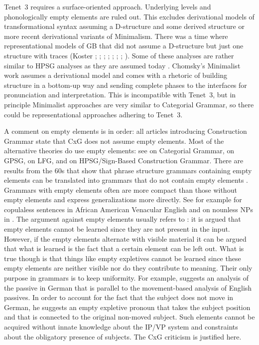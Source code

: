 \documentclass[output=paper]{langsci/langscibook}
\begin{document}
Tenet~3 requires a surface-oriented approach. Underlying levels and phonologically empty elements
are ruled out. This excludes derivational models of transformational syntax assuming a D-structure
and some derived structure or more recent derivational variants of Minimalism. There was a time
where representational models of GB that did not assume a D-structure but just one structure with
traces (Koster \citeyear[\page ]{Koster78b-u}; \citeyear[]{Koster87a-u}; 
\citealp{KT91a}; \citealp[Section~1.4]{Haider93a}; 
\citealp[]{Frey93a}; \citealp[--88, 177--178]{Lohnstein93a-u}; \citealp[]{FC94a}; \citealp[]{Veenstra98a}). Some of these analyses are rather similar to HPSG
analyses as they are assumed today \citep{Kiss95a,BvN98,Meurers2000b,Mueller2005c,MuellerGS,MuellerGermanic}. Chomsky's Minimalist work \citep{Chomsky95a-u} assumes a derivational model and comes
with a rhetoric of building structure in a bottom-up way and sending complete phases to the
interfaces for pronunciation and interpretation. This is incompatible with Tenet~3, but in principle
Minimalist approaches are very similar to Categorial Grammar, so there could be representational
approaches adhering to Tenet~3.

A comment on empty elements is in order: all articles introducing Construction Grammar state that
CxG does not assume empty elements. Most of the alternative theories do use empty elements: see
\citet{KoenigE99a-u} on Categorial Grammar, \citet*[]{GKPS85a} on GPSG, \citet[]{Bresnan2001a} on LFG,  and  on HPSG/Sign-Based
Construction Grammar. There are results from the 60s that show that phrase structure grammars
containing empty elements can be translated into grammars that do not contain empty elements
\citep*[, Lemma~4.1]{BHPS61a}. Grammars with empty elements often are more compact than
those without empty elements and express generalizations more directly. See for example
\citet{Bender2000a} for copulaless sentences in African American Venacular
English and \citet{Mueller2004e} on nounless NPs in
. The argument against empty elements usually refers to : it
is argued that empty elements cannot be learned since they are not present in the input. However,
if the empty elements alternate with visible material it can be argued that what is learned is the
fact that a certain element can be left out. What is true though is that things like empty
expletives cannot be learned since these empty elements are neither visible nor do they contribute to
meaning. Their only purpose in grammars is to keep uniformity. For example, \citet{Grewendorf93}
suggests an analysis of the passive in German that is parallel to the movement-based analysis of English
passives. In order to account for the fact that the subject does not move in German, he suggests an
empty expletive pronoun that takes the subject position and that is connected to the original
non-moved subject. Such elements cannot be acquired without innate knowledge about the IP/VP system and
constraints about the obligatory presence of subjects. The CxG criticism is justified here.
\end{document}
